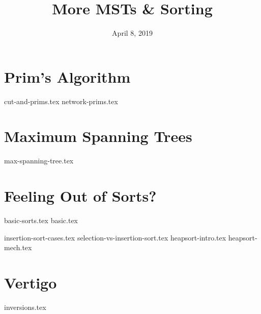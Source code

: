 \documentclass[11pt]{exam}
\title{More MSTs \& Sorting}
\date{April 8, 2019}
\begin{document}
\maketitle

\section{Prim's Algorithm}
\begin{questions}
{cut-and-prims.tex}
{network-prims.tex}
\end{questions}

\clearpage

\section{Maximum Spanning Trees}
\begin{questions}
{max-spanning-tree.tex}
\end{questions}

\clearpage

\section{Feeling Out of Sorts?}

{basic-sorts.tex}
{basic.tex}
\begin{questions}
{insertion-sort-cases.tex}
{selection-vs-insertion-sort.tex}
{heapsort-intro.tex}
{heapsort-mech.tex}

\end{questions}
\clearpage


\section{Vertigo}

\begin{questions}
{inversions.tex}
\end{questions}
\end{document}

